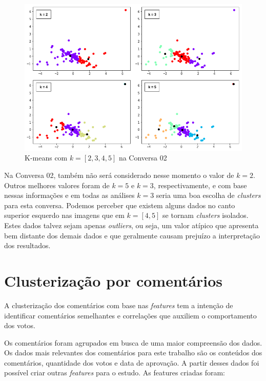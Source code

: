 \begin{figure}[!h]
	\centering
	\includegraphics[keepaspectratio=true,scale=0.58]{figuras/tcc2/compara-k-clusters-conversa-2.png}
	\caption{K-means com $k=[2,3,4,5]$ na Conversa 02}
	\label{fig:compara-cluster-conversa2}
\end{figure}


Na Conversa 02, também não será considerado nesse momento o valor de $k=2$. Outros melhores valores foram de $k=5$ e $k=3$, respectivamente, e com base nessas informações e em todas as análises $k=3$ seria uma boa escolha de \textit{clusters} para esta conversa. Podemos perceber que existem alguns dados no canto superior esquerdo nas imagens que em $k=[4,5]$ se tornam \textit{clusters} isolados. Estes dados talvez sejam apenas \textit{outliers}, ou seja, um valor atípico que apresenta bem distante dos demais dados e que geralmente causam prejuízo a interpretação dos resultados. 




\section{Clusterização por comentários}

A clusterização dos comentários com base nas \textit{features} tem a intenção de identificar comentários semelhantes e correlações que auxiliem o comportamento dos votos.

Os comentários foram agrupados em busca de uma maior compreensão dos dados. Os dados mais relevantes dos comentários para este trabalho são os conteúdos dos comentários, quantidade dos votos e data de aprovação. A partir desses dados foi possível criar outras \textit{features} para o estudo. As features criadas foram:

